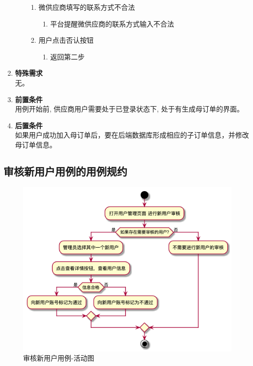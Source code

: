 \begin{enumerate}
\begin{enumerate}
\begin{enumerate}
            \item 微供应商填写的联系方式不合法
            \begin{enumerate}
                \item 平台提醒微供应商的联系方式输入不合法
            \end{enumerate}

            \item 用户点击否认按钮
            \begin{enumerate}
                \item 返回第二步
            \end{enumerate}
        \end{enumerate}
    \end{enumerate}
    \item \textbf{特殊需求} \\ 无。
    \item \textbf{前置条件} \\ 用例开始前, 供应商用户需要处于已登录状态下, 处于有生成母订单的界面。
    \item \textbf{后置条件} \\ 如果用户成功加入母订单后，要在后端数据库形成相应的子订单信息，并修改母订单信息。

\end{enumerate}

\subsection{审核新用户用例的用例规约}

\begin{figure}[htp]
    \centering
    \includegraphics[width=14cm]{report/figure/usecase_v2/1_uc_admin_check_user.png}
    \caption{审核新用户用例-活动图}
    \label{fig:1_uc_admin_check_user}
\end{figure}



